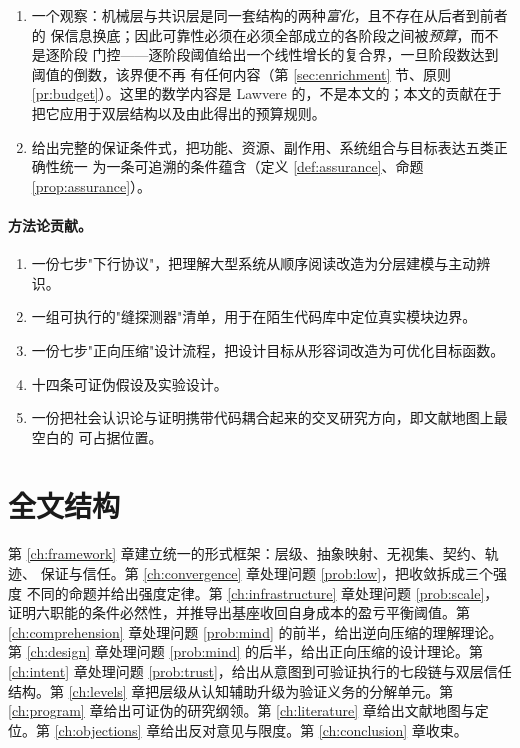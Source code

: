 \begin{enumerate}[label=(C\arabic*)]
\item 一个观察：机械层与共识层是同一套结构的两种\emph{富化}，且不存在从后者到前者的
      保信息换底；因此可靠性必须在必须全部成立的各阶段之间被\emph{预算}，而不是逐阶段
      门控——逐阶段阈值给出一个线性增长的复合界，一旦阶段数达到阈值的倒数，该界便不再
      有任何内容（第 \ref{sec:enrichment} 节、原则 \ref{pr:budget}）。这里的数学内容是
      Lawvere 的，不是本文的；本文的贡献在于把它应用于双层结构以及由此得出的预算规则。
\item 给出完整的保证条件式，把功能、资源、副作用、系统组合与目标表达五类正确性统一
      为一条可追溯的条件蕴含（定义 \ref{def:assurance}、命题 \ref{prop:assurance}）。
\end{enumerate}

\paragraph{方法论贡献。}
\begin{enumerate}[label=(M\arabic*)]
\item 一份七步"下行协议"，把理解大型系统从顺序阅读改造为分层建模与主动辨识。
\item 一组可执行的"缝探测器"清单，用于在陌生代码库中定位真实模块边界。
\item 一份七步"正向压缩"设计流程，把设计目标从形容词改造为可优化目标函数。
\item 十四条可证伪假设及实验设计。
\item 一份把社会认识论与证明携带代码耦合起来的交叉研究方向，即文献地图上最空白的
      可占据位置。
\end{enumerate}

\section{全文结构}

第 \ref{ch:framework} 章建立统一的形式框架：层级、抽象映射、无视集、契约、轨迹、
保证与信任。第 \ref{ch:convergence} 章处理问题 \ref{prob:low}，把收敛拆成三个强度
不同的命题并给出强度定律。第 \ref{ch:infrastructure} 章处理问题 \ref{prob:scale}，
证明六职能的条件必然性，并推导出基座收回自身成本的盈亏平衡阈值。第
\ref{ch:comprehension} 章处理问题 \ref{prob:mind} 的前半，给出逆向压缩的理解理论。
第 \ref{ch:design} 章处理问题
\ref{prob:mind} 的后半，给出正向压缩的设计理论。第 \ref{ch:intent} 章处理问题
\ref{prob:trust}，给出从意图到可验证执行的七段链与双层信任结构。第
\ref{ch:levels} 章把层级从认知辅助升级为验证义务的分解单元。第 \ref{ch:program}
章给出可证伪的研究纲领。第 \ref{ch:literature} 章给出文献地图与定位。第
\ref{ch:objections} 章给出反对意见与限度。第 \ref{ch:conclusion} 章收束。

